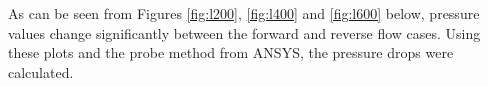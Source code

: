 \begin{table}[H]
\centering
\caption{Diodicities of all configurations}
\label{tab:diodicities}
\end{table}





As can be seen from Figures \ref{fig:l200}, \ref{fig:l400} and \ref{fig:l600} below, pressure values change significantly between the forward and reverse flow cases. Using these plots and the probe method from ANSYS, the pressure drops were calculated. 


